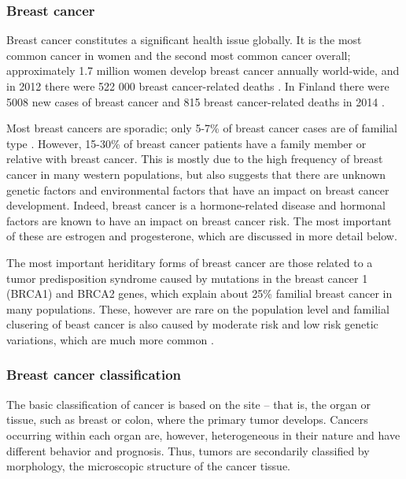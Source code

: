 \subsubsection{Breast cancer}\label{breast-cancer}

Breast cancer constitutes a significant health issue globally. It is the most
common cancer in women and the second most common cancer overall;
approximately 1.7 million women develop breast cancer annually world-wide, and
in 2012 there were 522 000 breast cancer-related deaths
\citep{Ferlay2015}. In Finland there were 5008 new cases of breast cancer
 and 815 breast cancer-related deaths in 2014 \citep{Syoparekisteri}.

Most breast cancers are sporadic; only 5-7\% of breast cancer cases are of
familial type \citep{Melchor2013}. However, 15-30\% of breast cancer patients
have a family member or relative with breast cancer. This is
mostly due to the high frequency of breast cancer in many western populations,
but also suggests that there are unknown genetic factors and environmental
factors that have an impact on breast cancer development. Indeed, breast
cancer is a hormone-related disease and hormonal factors are known to have an
impact on breast cancer risk. The most important of these are
estrogen and progesterone, which are discussed in more detail below.

The most important heriditary forms of breast cancer are those related to a
tumor predisposition syndrome caused by mutations in the breast cancer 1
(BRCA1) and BRCA2 genes, which explain about 25\% familial breast cancer in
many populations. These, however are rare on the population level and familial
clusering of beast cancer is also caused by moderate risk and low risk genetic
variations, which are much more common \citep{Melchor2013}.


\subsubsection{Breast cancer classification}\label{breast-cancer-classification}

The basic classification of cancer is based on the site -- that is, the organ
or tissue, such as breast or colon, where the primary tumor develops. Cancers
occurring within each organ are, however, heterogeneous in their nature and
have different behavior and prognosis. Thus, tumors are secondarily classified
by morphology, the microscopic structure of the cancer tissue.

